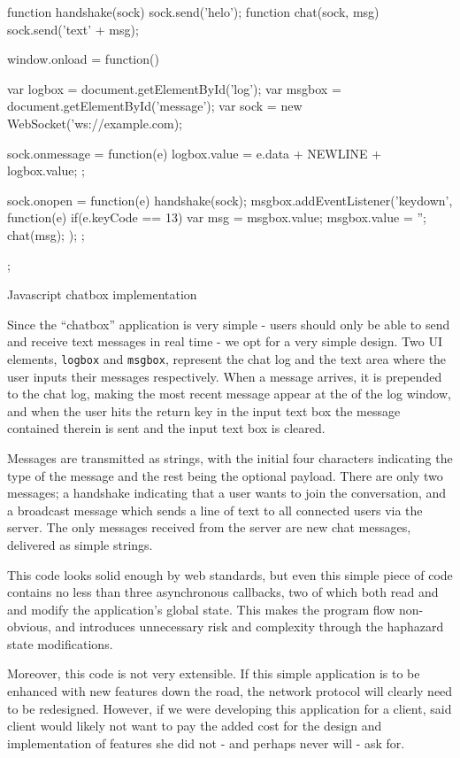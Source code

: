 \documentclass[preprint]{sigplanconf}
\begin{document}
\begin{listingfloat}
\begin{code}
function handshake(sock) {sock.send('helo');}
function chat(sock, msg) {sock.send('text' + msg);}

window.onload = function() {
  var logbox = document.getElementById('log');
  var msgbox = document.getElementById('message');
  var sock = new WebSocket('ws://example.com);

  sock.onmessage = function(e) {
    logbox.value = e.data + NEWLINE + logbox.value;
  };

  sock.onopen = function(e) {
    handshake(sock);
    msgbox.addEventListener('keydown', function(e) {
      if(e.keyCode == 13) {
        var msg = msgbox.value;
        msgbox.value = '';
        chat(msg);
      }
    });
  };
};
\end{code}
\caption{Javascript chatbox implementation}
\label{lst:javascript-client}
\end{listingfloat}

Since the ``chatbox'' application is very simple - users should only be able to
send and receive text messages in real time - we opt for a very simple
design. Two UI elements, \lstinline!logbox! and \lstinline!msgbox!, represent
the chat log and the text area where the user inputs their messages
respectively. When a message arrives, it is prepended to the chat log, making
the most recent message appear at the of the log window, and when the user hits
the return key in the input text box the message contained therein is sent and
the input text box is cleared.

Messages are transmitted as strings, with the initial four characters
indicating the type of the message and the rest being the optional payload.
There are only two messages; a handshake indicating that a user wants to join
the conversation, and a broadcast message which sends a line of text to all
connected users via the server. The only messages received from the server are
new chat messages, delivered as simple strings.

This code looks solid enough by web standards, but even this simple piece of
code contains no less than three asynchronous callbacks, two of which both read
and and modify the application's global state. This makes the program flow
non-obvious, and introduces unnecessary risk and complexity through the
haphazard state modifications.

Moreover, this code is not very extensible. If this simple application is to be
enhanced with new features down the road, the network protocol will clearly
need to be redesigned. However, if we were developing this application for a
client, said client would likely not want to pay the added cost for the design
and implementation of features she did not - and perhaps never will - ask for.
\end{document}
